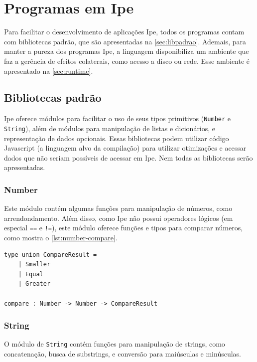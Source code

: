
\chapter{Programas em Ipe}\label{chapter:programas-em-ipe}

Para facilitar o desenvolvimento de aplicações Ipe, todos os programas contam com
bibliotecas padrão, que são apresentadas na \autoref{sec:libpadrao}. Ademais, para
manter a pureza dos programas Ipe, a linguagem disponibiliza um ambiente que
faz a gerência de efeitos colaterais, como acesso a disco ou rede. Esse ambiente
é apresentado na \autoref{sec:runtime}.

\section{Bibliotecas padrão}\label{sec:libpadrao}

Ipe oferece módulos para facilitar o uso de seus tipos primitivos (\texttt{Number}
e \texttt{String}), além de módulos para manipulação de listas e dicionários, e
representação de dados opcionais. Essas bibliotecas podem utilizar código Javascript
(a linguagem alvo da compilação) para utilizar otimizações e acessar dados que
não seriam possíveis de acessar em Ipe. Nem todas as bibliotecas serão apresentadas.

\subsection{Number}

Este módulo contém algumas funções para manipulação de números, como arrendondamento.
Além disso, como Ipe não possui operadores lógicos (em especial \texttt{==} e \texttt{!=}),
este módulo oferece funções e tipos para comparar números, como mostra o \autoref{lst:number-compare}.

\begin{lstlisting}[label={lst:number-compare},caption={Comparação de números em Ipe}]
type union CompareResult =
    | Smaller
    | Equal
    | Greater

compare : Number -> Number -> CompareResult
\end{lstlisting}

\subsection{String}

O módulo de \texttt{String} contém funções para manipulação de strings, como
concatenação, busca de substrings, e conversão para maiúsculas e minúsculas.

